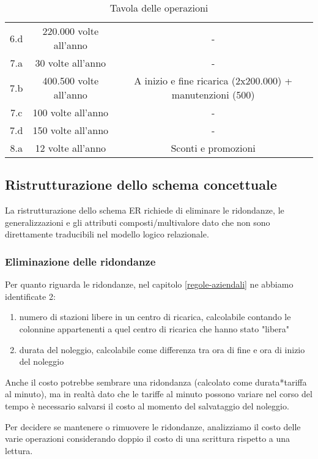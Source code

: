 \documentclass{article}
\begin{document}
\begin{table}[H]
\begin{tabular}{|c|c|c|}
        6.d & 220.000 volte all'anno & - \\
        7.a & 30 volte all'anno & -\\
        7.b & 400.500 volte all'anno & A inizio e fine ricarica (2x200.000) + manutenzioni (500) \\
        7.c & 100 volte all'anno & - \\
        7.d & 150 volte all'anno & - \\
        8.a & 12 volte all'anno & Sconti e promozioni \\
        \hline
    \end{tabular}
    \caption{Tavola delle operazioni}
    \label{tab:Tavola delle operazioni}
\end{table}


\subsection{Ristrutturazione dello schema concettuale}

La ristrutturazione dello schema ER richiede di eliminare le ridondanze, le generalizzazioni e gli attributi composti/multivalore dato che non sono direttamente traducibili nel modello logico relazionale. 


\subsubsection{Eliminazione delle ridondanze}
Per quanto riguarda le ridondanze, nel capitolo \ref{regole-aziendali} ne abbiamo identificate 2:

\begin{enumerate}
    \item numero di stazioni libere in un centro di ricarica, calcolabile contando le colonnine appartenenti a quel centro di ricarica che hanno stato "libera"
    \item durata del noleggio, calcolabile come differenza tra ora di fine e ora di inizio del noleggio
\end{enumerate}

Anche il costo potrebbe sembrare una ridondanza (calcolato come durata*tariffa al minuto), ma in realtà dato che le tariffe al minuto possono variare nel corso del tempo è necessario salvarsi il costo al momento del salvataggio del noleggio.

Per decidere se mantenere o rimuovere le ridondanze, analizziamo il costo delle varie operazioni considerando doppio il costo di una scrittura rispetto a una lettura.
\end{document}
